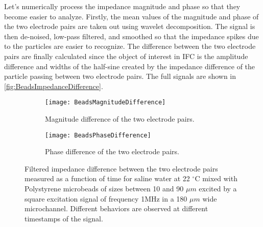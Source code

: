 Let's numerically process the impedance magnitude and phase so that they become easier to analyze. Firstly, the mean values of the magnitude and phase of the two electrode pairs are taken out using wavelet decomposition. The signal is then de-noised, low-pass filtered, and smoothed so that the impedance spikes due to the particles are easier to recognize. The difference between the two electrode pairs are finally calculated since the object of interest in IFC is the amplitude difference and widths of the half-sine created by the impedance difference of the particle passing between two electrode pairs. The full signals are shown in \autoref{fig:BeadsImpedanceDifference}. \par
\begin{figure}[h]
\centering
\begin{subfigure}{0.99\textwidth}
\centering
    \texttt{[image: BeadsMagnitudeDifference]}
    \caption{Magnitude difference of the two electrode pairs.}
    \label{fig:BeadsMagnitudeDifference}
\end{subfigure}
\begin{subfigure}{0.99\textwidth}
\centering
    \texttt{[image: BeadsPhaseDifference]}
    \caption{Phase difference of the two electrode pairs.}
    \label{fig:BeadsPhaseDifference}
\end{subfigure}
\caption{Filtered impedance difference between the two electrode pairs measured as a function of time for saline water at 22 $^{\circ}$C mixed with Polystyrene microbeads of sizes between 10 and 90 $\mu m$  excited by a square excitation signal of frequency 1MHz in a 180 $\mu m$ wide microchannel. Different behaviors are observed at different timestamps of the signal.}
\label{fig:BeadsImpedanceDifference}
\end{figure}

